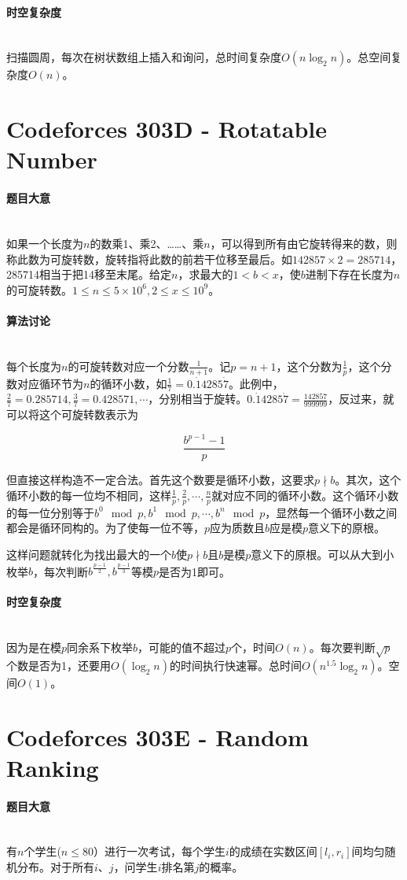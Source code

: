 \documentclass[UTF8]{ctexart}
\newcommand{\myparagraph}[1]{\paragraph{#1}\mbox{}\\}
\theoremstyle{nonumberplain}
\begin{document}
		\myparagraph{时空复杂度}
		
			扫描圆周，每次在树状数组上插入和询问，总时间复杂度$O(n\log_2n)$。总空间复杂度$O(n)$。
	
	\section{Codeforces 303D - Rotatable Number}
	
		\myparagraph{题目大意}
		
			如果一个长度为$n$的数乘1、乘2、……、乘$n$，可以得到所有由它旋转得来的数，则称此数为可旋转数，旋转指将此数的前若干位移至最后。如$142857 \times 2=285714$，285714相当于把14移至末尾。给定$n$，求最大的$1<b<x$，使$b$进制下存在长度为$n$的可旋转数。$1 \leq n \leq 5 \times 10^6, 2 \leq x \leq 10^9$。
		
		\myparagraph{算法讨论}
		
			每个长度为$n$的可旋转数对应一个分数$\frac{1}{n+1}$。记$p=n+1$，这个分数为$\frac{1}{p}$，这个分数对应循环节为$n$的循环小数，如$\frac{1}{7}=0.\dot{1}4285\dot{7}$。此例中，$\frac{2}{7}=0.285714, \frac{3}{7}=0.428571, \cdots$，分别相当于旋转。$0.\dot{1}4285\dot{7}=\frac{142857}{999999}$，反过来，就可以将这个可旋转数表示为
			
			$$\frac{b^{p-1}-1}{p}$$
			
			但直接这样构造不一定合法。首先这个数要是循环小数，这要求$p \nmid b$。其次，这个循环小数的每一位均不相同，这样$\frac{1}{p}, \frac{2}{p}, \cdots, \frac{n}{p}$就对应不同的循环小数。这个循环小数的每一位分别等于$b^0 \mod p, b^1 \mod p, \cdots, b^n \mod p$，显然每一个循环小数之间都会是循环同构的。为了使每一位不等，$p$应为质数且$b$应是模$p$意义下的原根。
			
			这样问题就转化为找出最大的一个$b$使$p \nmid b$且$b$是模$p$意义下的原根。可以从大到小枚举$b$，每次判断$b^{\frac{p-1}{2}}, b^{\frac{p-1}{3}}$等模$p$是否为1即可。
		
		\myparagraph{时空复杂度}
		
			因为是在模$p$同余系下枚举$b$，可能的值不超过$p$个，时间$O(n)$。每次要判断$\sqrt{p}$个数是否为1，还要用$O(\log_2n)$的时间执行快速幂。总时间$O(n^{1.5} \log_2n)$。空间$O(1)$。
	
	\section{Codeforces 303E - Random Ranking}
	
		\myparagraph{题目大意}
		
			有$n$个学生($n \leq 80$）进行一次考试，每个学生$i$的成绩在实数区间$[l_i,r_i]$间均匀随机分布。对于所有$i$、$j$，问学生$i$排名第$j$的概率。
		
\end{document}
